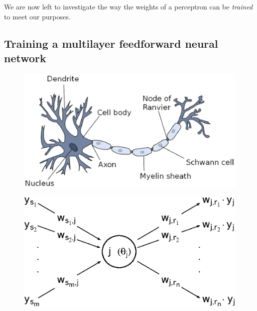 \documentclass[11pt, a4paper]{report}
\theoremstyle{theorem}
\numberwithin{equation}{section}
\numberwithin{figure}{section}
\begin{document}
		We are now left to investigate the way the weights of a perceptron can be \emph{trained} to meet our purposes.
		
	\subsection{Training a multilayer feedforward neural network}
		
		
		
		
		\begin{figure}[H]
			\center
			\includegraphics[scale = 0.5]{neuron.eps}
			
			\caption{}
			\label{fig:neuron}
		\end{figure}
		
		\begin{figure}[H]
			\center
			\includegraphics[scale = 0.7]{neural_model_ter.eps}
			
			\caption{}
			\label{fig:neural-model}
		\end{figure}
		
\end{document}
